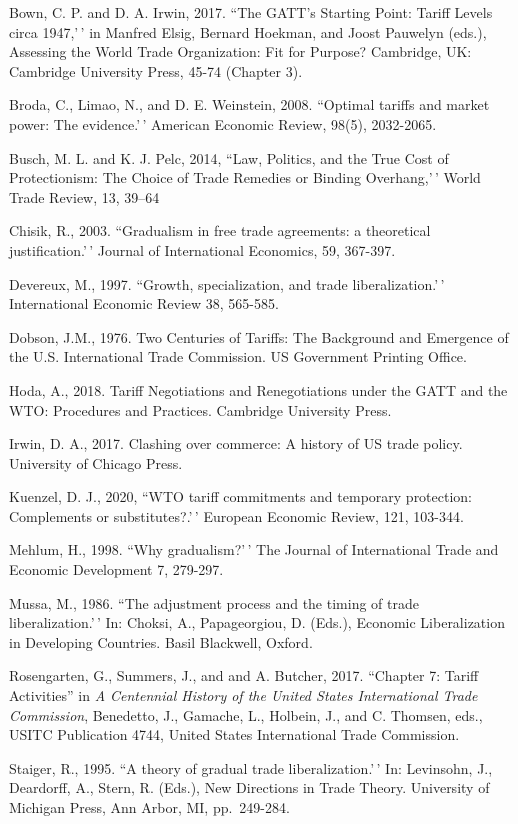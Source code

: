 \documentclass[
  12pt,
]{article}
\begin{document}
Bown, C. P. and D. A. Irwin, 2017. ``The GATT's Starting Point: Tariff Levels circa 1947,'\,' in Manfred Elsig, Bernard Hoekman, and Joost Pauwelyn (eds.), Assessing the World Trade Organization: Fit for Purpose? Cambridge, UK: Cambridge University Press, 45-74 (Chapter 3).

Broda, C., Limao, N., and D. E. Weinstein, 2008. ``Optimal tariffs and market power: The
evidence.'\,' American Economic Review, 98(5), 2032-2065.

Busch, M. L. and K. J. Pelc, 2014, ``Law, Politics, and the True Cost of Protectionism: The Choice of Trade Remedies or Binding Overhang,'\,' World Trade Review, 13, 39--64

Chisik, R., 2003. ``Gradualism in free trade agreements: a theoretical justification.'\,' Journal of International Economics, 59, 367-397.

Devereux, M., 1997. ``Growth, specialization, and trade liberalization.'\,' International Economic Review
38, 565-585.

Dobson, J.M., 1976. Two Centuries of Tariffs: The Background and Emergence of the U.S. International Trade Commission. US Government Printing Office.

Hoda, A., 2018. Tariff Negotiations and Renegotiations under the GATT and the WTO: Procedures and Practices. Cambridge University Press.

Irwin, D. A., 2017. Clashing over commerce: A history of US trade policy. University of Chicago Press.

Kuenzel, D. J., 2020, ``WTO tariff commitments and temporary protection: Complements or substitutes?.'\,' European Economic Review, 121, 103-344.

Mehlum, H., 1998. ``Why gradualism?'\,' The Journal of International Trade and Economic Development 7, 279-297.

Mussa, M., 1986. ``The adjustment process and the timing of trade liberalization.'\,' In: Choksi, A., Papageorgiou, D. (Eds.), Economic Liberalization in Developing Countries. Basil Blackwell, Oxford.

Rosengarten, G., Summers, J., and and A. Butcher, 2017. ``Chapter 7: Tariff Activities'' in \emph{A Centennial History of the United States International Trade Commission}, Benedetto, J., Gamache, L., Holbein, J., and C. Thomsen, eds., USITC Publication 4744, United States International Trade Commission.

Staiger, R., 1995. ``A theory of gradual trade liberalization.'\,' In: Levinsohn, J., Deardorff, A., Stern, R. (Eds.), New Directions in Trade Theory. University of Michigan Press, Ann Arbor, MI, pp.~249-284.
\end{document}
